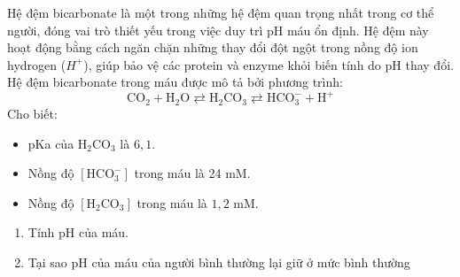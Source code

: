 \begin{bt}
	Hệ đệm bicarbonate là một trong những hệ đệm quan trọng nhất trong cơ thể người, đóng vai trò thiết yếu trong việc duy trì pH máu ổn định. Hệ đệm này hoạt động bằng cách ngăn chặn những thay đổi đột ngột trong nồng độ ion hydrogen ($H^+$), giúp bảo vệ các protein và enzyme khỏi biến tính do pH thay đổi.
	\\
	Hệ đệm bicarbonate trong máu được mô tả bởi phương trình:
	\[\mathrm{CO}_2+\mathrm{H}_2 \mathrm{O} \rightleftarrows \mathrm{H}_2 \mathrm{CO}_3 \rightleftarrows \mathrm{HCO}_3^{-}+\mathrm{H}^{+}\]
	Cho biết:
	\begin{itemize}
		\item pKa của $\mathrm{H}_2 \mathrm{CO}_3$ là $6{,}1$.
		\item Nồng độ $\left[\mathrm{HCO}_3^{-}\right]$ trong máu là 24 mM.
		\item Nồng độ $\left[\mathrm{H}_2 \mathrm{CO}_3\right]$ trong máu là $1{,}2$ mM.
	\end{itemize}
	\begin{enumerate}
		\item Tính pH của máu.
		\item Tại sao pH của máu của người bình thường lại giữ ở mức bình thường 
	\end{enumerate}
\end{bt}
